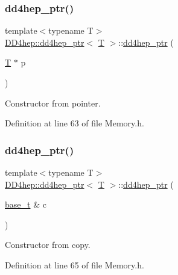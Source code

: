 \subsubsection{\texorpdfstring{dd4hep\+\_\+ptr()}{dd4hep\_ptr()}\hspace{0.1cm}{\footnotesize\ttfamily [3/4]}}
{\footnotesize\ttfamily template$<$typename T$>$ \\
\hyperlink{class_d_d4hep_1_1dd4hep__ptr}{D\+D4hep\+::dd4hep\+\_\+ptr}$<$ \hyperlink{class_t}{T} $>$\+::\hyperlink{class_d_d4hep_1_1dd4hep__ptr}{dd4hep\+\_\+ptr} (\begin{DoxyParamCaption}\item[{\hyperlink{class_t}{T} $\ast$}]{p }\end{DoxyParamCaption})\hspace{0.3cm}{\ttfamily [inline]}}



Constructor from pointer. 



Definition at line 63 of file Memory.\+h.

\hypertarget{class_d_d4hep_1_1dd4hep__ptr_a37f6577690b416db238cf3153dbb966e}{}\label{class_d_d4hep_1_1dd4hep__ptr_a37f6577690b416db238cf3153dbb966e} 
\subsubsection{\texorpdfstring{dd4hep\+\_\+ptr()}{dd4hep\_ptr()}\hspace{0.1cm}{\footnotesize\ttfamily [4/4]}}
{\footnotesize\ttfamily template$<$typename T$>$ \\
\hyperlink{class_d_d4hep_1_1dd4hep__ptr}{D\+D4hep\+::dd4hep\+\_\+ptr}$<$ \hyperlink{class_t}{T} $>$\+::\hyperlink{class_d_d4hep_1_1dd4hep__ptr}{dd4hep\+\_\+ptr} (\begin{DoxyParamCaption}\item[{\hyperlink{class_d_d4hep_1_1dd4hep__ptr_a4bcbed2d2a920d0a5ffbf405263fe8d6}{base\+\_\+t} \&}]{c }\end{DoxyParamCaption})\hspace{0.3cm}{\ttfamily [inline]}}



Constructor from copy. 



Definition at line 65 of file Memory.\+h.



